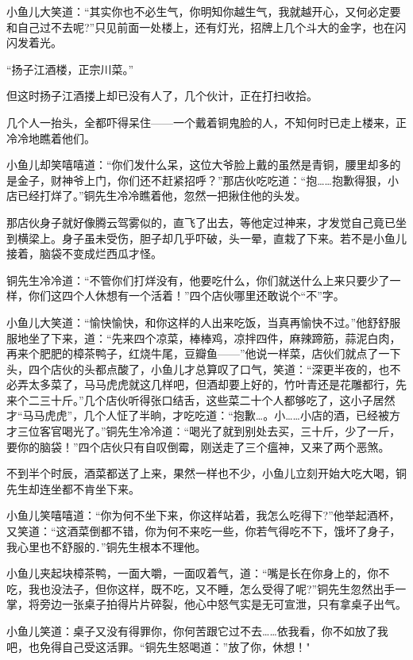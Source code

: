 \documentclass[12pt,oneside]{book}
\begin{document}
小鱼儿大笑道：``其实你也不必生气，你明知你越生气，我就越开心，又何必定要和自己过不去呢?''只见前面一处楼上，还有灯光，招牌上几个斗大的金字，也在闪闪发着光。

``扬子江酒楼，正宗川菜。''

但这时扬子江酒搂上却已没有人了，几个伙计，正在打扫收拾。

几个人一抬头，全都吓得呆住------一个戴着铜鬼脸的人，不知何时已走上楼来，正冷冷地瞧着他们。

小鱼儿却笑嘻嘻道：``你们发什么呆，这位大爷脸上戴的虽然是青铜，腰里却多的是金子，财神爷上门，你们还不赶紧招呼？''那店伙吃吃道：``抱\ldots\ldots 抱歉得狠，小店已经打烊了。''铜先生冷冷瞧着他，忽然一把揪住他的头发。

那店伙身子就好像腾云驾雾似的，直飞了出去，等他定过神来，才发觉自己竟已坐到横梁上。身子虽未受伤，胆子却几乎吓破，头一晕，直栽了下来。若不是小鱼儿接着，脑袋不变成烂西瓜才怪。

铜先生冷冷道：``不管你们打烊没有，他要吃什么，你们就送什么上来只要少了一样，你们这四个人休想有一个活着！''四个店伙哪里还敢说个``不''字。

小鱼儿大笑道：``愉快愉快，和你这样的人出来吃饭，当真再愉快不过。''他舒舒服服地坐了下来，道：``先来四个凉菜，棒棒鸡，凉拌四件，麻辣蹄筋，蒜泥白肉，再来个肥肥的樟茶鸭子，红烧牛尾，豆瓣鱼------''他说一样菜，店伙们就点了一下头，四个店伙的头都点酸了，小鱼儿才总算叹了口气，笑道：``深更半夜的，也不必弄太多菜了，马马虎虎就这几样吧，但酒却要上好的，竹叶青还是花雕都行，先来个二三十斤。''几个店伙听得张口结舌，这些菜二十个人都够吃了，这小子居然才``马马虎虎''，几个人怔了半晌，才吃吃道：``抱歉\ldots。小\ldots\ldots 小店的酒，已经被方才三位客官喝光了。''铜先生冷冷道：``喝光了就到别处去买，三十斤，少了一斤，要你的脑袋！''四个店伙只有自叹倒霉，刚送走了三个瘟神，又来了两个恶煞。

不到半个时辰，酒菜都送了上来，果然一样也不少，小鱼儿立刻开始大吃大喝，铜先生却连坐都不肯坐下来。

小鱼儿笑嘻嘻道：``你为何不坐下来，你这样站着，我怎么吃得下?''他举起酒杯，又笑道：``这酒菜倒都不错，你为何不来吃一些，你若气得吃不下，饿坏了身子，我心里也不舒服的．''铜先生根本不理他。

小鱼儿夹起块樟茶鸭，一面大嚼，一面叹着气，道：``嘴是长在你身上的，你不吃，我也没法子，但你这样，既不吃，又不睡，怎么受得了呢?''铜先生忽然出手一掌，将旁边一张桌子拍得片片碎裂，他心中怒气实是无可宣泄，只有拿桌子出气。

小鱼儿笑道：桌子又没有得罪你，你何苦跟它过不去\ldots\ldots 依我看，你不如放了我吧，也免得自己受这活罪。``铜先生怒喝道：''放了你，休想！"
\end{document}
